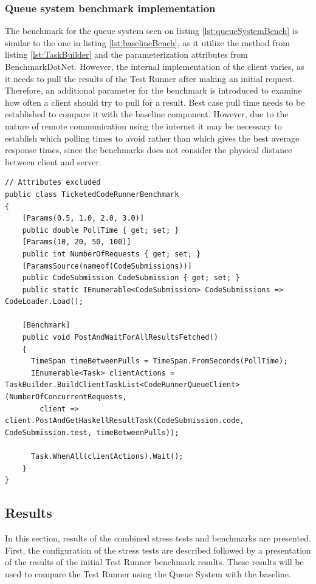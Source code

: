 \subsubsection{Queue system benchmark implementation}
The benchmark for the queue system seen on listing \ref{lst:queueSystemBench} is similar to the one in listing \ref{lst:baselineBench}, as it utilize the method from listing \ref{lst:TaskBuilder} and the parameterization attributes from BenchmarkDotNet.
However, the internal implementation of the client varies, as it needs to pull the results of the Test Runner after making an initial request.
Therefore, an additional parameter for the benchmark is introduced to examine how often a client should try to pull for a result.
Best case pull time needs to be established to compare it with the baseline component. 
However, due to the nature of remote communication using the internet it may be necessary to establish which polling times to avoid rather than which gives the best average response times, since the benchmarks does not consider the physical distance between client and server.
\begin{lstlisting}[language=CSharp, escapechar=~, caption={C\# code showing the implementation of the benchmark for the backend with the Queue System }, label={lst:queueSystemBench}]
// Attributes excluded
public class TicketedCodeRunnerBenchmark
{
    [Params(0.5, 1.0, 2.0, 3.0)] 
    public double PollTime { get; set; }
    [Params(10, 20, 50, 100)] 
    public int NumberOfRequests { get; set; }
    [ParamsSource(nameof(CodeSubmissions))] 
    public CodeSubmission CodeSubmission { get; set; }
    public static IEnumerable<CodeSubmission> CodeSubmissions => CodeLoader.Load();

    [Benchmark]
    public void PostAndWaitForAllResultsFetched()
    {
      TimeSpan timeBetweenPulls = TimeSpan.FromSeconds(PollTime);
      IEnumerable<Task> clientActions = TaskBuilder.BuildClientTaskList<CodeRunnerQueueClient>(NumberOfConcurrentRequests, 
        client => client.PostAndGetHaskellResultTask(CodeSubmission.code, CodeSubmission.test, timeBetweenPulls));

      Task.WhenAll(clientActions).Wait();
    }
}
\end{lstlisting}

\subsection{Results}
In this section, results of the combined stress tests and benchmarks are presented.
First, the configuration of the stress tests are described followed by a presentation of the results of the initial Test Runner benchmark results. These results will be used to compare the Test Runner using the Queue System with the baseline.  

